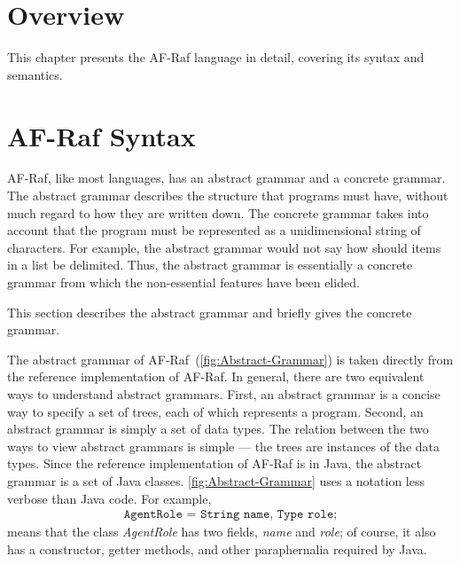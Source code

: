 \documentclass[a4paper,12pt,oneside,fleqn]{book} %
\begin{document}
\section{Overview}\label{sec:langdef.overview} %

This chapter presents the AF-Raf language in detail, covering its syntax
and semantics.

\section{AF-Raf Syntax}\label{sec:langdef.syntax} %

AF-Raf, like most languages, has an abstract grammar and a concrete
grammar. The abstract grammar describes the structure that programs must
have, without much regard to how they are written down. The concrete
grammar takes into account that the program must be represented as a
unidimensional string of characters. For example, the abstract grammar
would not say how should items in a list be delimited. Thus, the abstract
grammar is essentially a concrete grammar from which the non-essential
features have been elided.

This section describes the abstract grammar and briefly gives the concrete
grammar.

The abstract grammar of AF-Raf~(\autoref{fig:Abstract-Grammar}) is taken
directly from the reference implementation of AF-Raf.  In general, there
are two equivalent ways to understand abstract grammars. First, an abstract
grammar is a concise way to specify a set of trees, each of which
represents a program. Second, an abstract grammar is simply a set of data
types. The relation between the two ways to view abstract grammars is
simple --- the trees are instances of the data types. Since the reference
implementation of AF-Raf is in Java, the abstract grammar is a set of Java
classes. \autoref{fig:Abstract-Grammar} uses a notation less verbose than
Java code. For example,
\begin{align}
\texttt{AgentRole = String name, Type role;}
\end{align}
means that the class {\it AgentRole\/} has two fields, {\it name\/} and
{\it role}; of course, it also has a constructor, getter methods, and other
paraphernalia required by Java.
\end{document}
